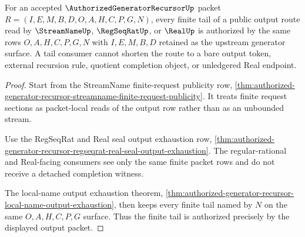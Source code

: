 \begin{theorem}
\label{thm:authorized-generator-recursor-finite-tail-authorization}
For an accepted $\AuthorizedGeneratorRecursorUp$ packet
$R=(I,E,M,B,D,O,A,H,C,P,G,N)$, every finite tail of a public output route read
by $\StreamNameUp$, $\RegSeqRatUp$, or $\RealUp$ is authorized by the same
rows $O,A,H,C,P,G,N$ with $I,E,M,B,D$ retained as the upstream generator
surface. A tail consumer cannot shorten the route to a bare output token,
external recursion rule, quotient completion object, or unledgered Real
endpoint.
\end{theorem}
\begin{proof}
Start from the StreamName finite-request publicity row,
\autoref{thm:authorized-generator-recursor-streamname-finite-request-publicity}.
It treats finite request sections as packet-local reads of the output row
rather than as an unbounded stream.

Use the RegSeqRat and Real seal output exhaustion row,
\autoref{thm:authorized-generator-recursor-regseqrat-real-seal-output-exhaustion}.
The regular-rational and Real-facing consumers see only the same finite packet
rows and do not receive a detached completion witness.

The local-name output exhaustion theorem,
\autoref{thm:authorized-generator-recursor-local-name-output-exhaustion},
then keeps every finite tail named by $N$ on the same $O,A,H,C,P,G$ surface.
Thus the finite tail is authorized precisely by the displayed output packet.
\end{proof}

